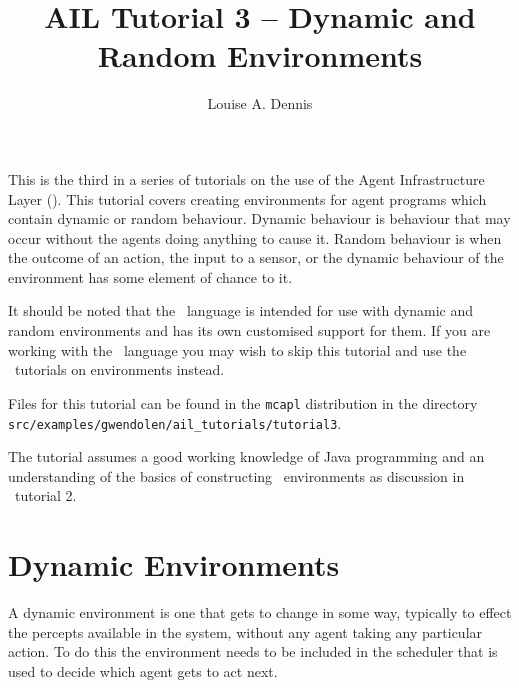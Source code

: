 \documentclass[a4]{article}
\author{Louise A. Dennis}
\title{AIL Tutorial 3 -- Dynamic and Random Environments}
\begin{document}
\maketitle
This is the third in a series of tutorials on the use of the Agent Infrastructure Layer (\ail).  This tutorial covers creating environments for agent programs which contain dynamic or random behaviour.   Dynamic behaviour is behaviour that may occur without the agents doing anything to cause it.  Random behaviour is when the outcome of an action, the input to a sensor, or the dynamic behaviour of the environment has some element of chance to it.

It should be noted that the \eass\ language is intended for use with dynamic and random environments and has its own customised support for them.  If you are working with the \eass\ language you may wish to skip this tutorial and use the \eass\ tutorials on environments instead.

Files for this tutorial can be found in the \texttt{mcapl} distribution in the directory \texttt{src/examples/gwendolen/ail\_tutorials/tutorial3}.

The tutorial assumes a good working knowledge of Java programming and an understanding of the basics of constructing \ail\ environments as discussion in \ail\ tutorial 2.

\section{Dynamic Environments}

A dynamic environment is one that gets to change in some way, typically to effect the percepts available in the system, without any agent taking any particular action.  To do this the environment needs to be included in the scheduler that is used to decide which agent gets to act next.
\end{document}
